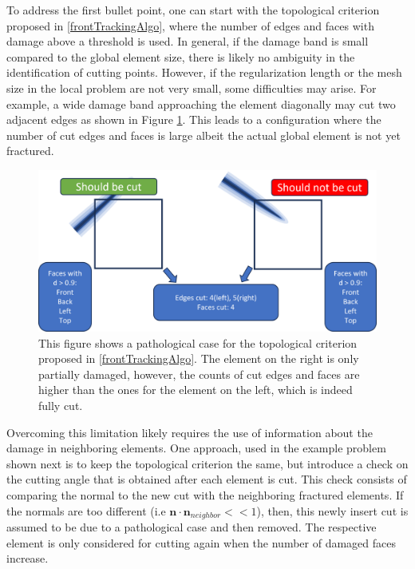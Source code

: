 To address the first bullet point, one can start with the topological criterion proposed in \ref{frontTrackingAlgo}, where the number of edges and faces with damage above a threshold is used. In general, if the damage band is small compared to the global element size, there is likely no ambiguity in the identification of cutting points. However, if the regularization length or the mesh size in the local problem are not very small, some difficulties may arise. For example, a wide damage band approaching the element diagonally may cut two adjacent edges as shown in Figure \ref{fig:pathological_case}. This leads to a configuration where the number of cut edges and faces is large albeit the actual global element is not yet fractured. 

\begin{figure}
    \centering
    \includegraphics[width=\linewidth]{Chapter4/figures/nonplanar/pathology.png}
    \caption{This figure shows a pathological case for the topological criterion proposed in \ref{frontTrackingAlgo}. The element on the right is only partially damaged, however, the counts of cut edges and faces are higher than the ones for the element on the left, which is indeed fully cut.}
    \label{fig:pathological_case}
\end{figure}%

Overcoming this limitation likely requires the use of information about the damage in neighboring elements. One approach, used in the example problem shown next is to keep the topological criterion the same, but introduce a check on the cutting angle that is obtained after each element is cut. This check consists of comparing the normal to the new cut with the neighboring fractured elements. If the normals are too different (i.e $\textbf{n}\cdot\textbf{n}_{neighbor} << 1$), then, this newly insert cut is assumed to be due to a pathological case and then removed. The respective element is only considered for cutting again when the number of damaged faces increase.

